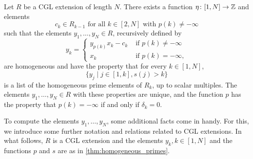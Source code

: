 \documentclass{article}
\begin{document}
\begin{theorem}\label{thm:homogeneous_primes}
	Let $R$ be a CGL extension of length $N$. There exists a function $\eta \colon [1, N] \to \mathbb{Z}$ and elements
	\begin{equation*}
		c_k \in R_{k-1} \text{ for all } k \in [2,N] \text{ with } p(k) \neq - \infty
	\end{equation*}
	such that the elements $y_1, \dots, y_N \in R$, recursively defined by
	\begin{equation*}
		y_k = \begin{cases}
			y_{p(k)}x_k - c_k & \text{ if } p(k) \neq -\infty \\
			x_k               & \text{ if } p(k) = -\infty,
		\end{cases}
	\end{equation*}
	are homogeneous and have the property that for every $k \in [1, N]$,
	\begin{equation*}
		\{y_j \mid j \in [1, k], s(j) > k\}
	\end{equation*}
	is a list of the homogeneous prime elements of $R_k$, up to scalar multiples. The
	elements $y_1, \dots, y_N \in R$ with these properties are unique, and the function $p$
	has the property that $p(k) = - \infty$ if and only if $\delta_k = 0$.
\end{theorem}

To compute the elements $y_1, \dots, y_N$, some additional facts come in handy. For
this, we introduce some further notation and relations related to CGL extensions. In
what follows, $R$ is a CGL extension and the elements $y_k, k \in [1, N]$ and the
functions $p$ and $s$ are as in \cref{thm:homogeneous_primes}.
\end{document}
